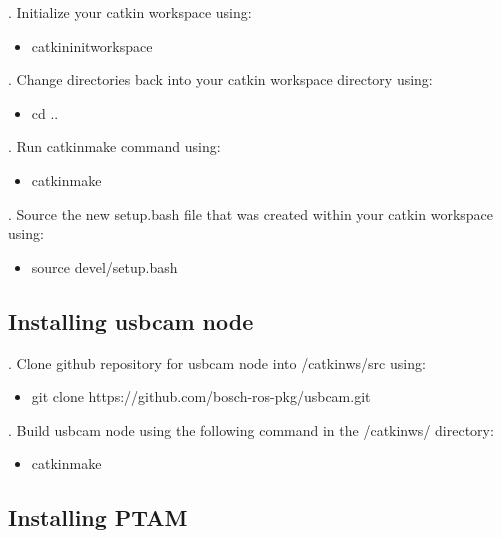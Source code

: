 . Initialize your catkin workspace using:
\begin{itemize}
	\item[]catkin\textunderscore init\textunderscore workspace
\end{itemize}

. Change directories back into your catkin workspace directory using:
\begin{itemize}
	\item[]cd ..
\end{itemize}

. Run catkin\textunderscore make command using:
\begin{itemize}
	\item[]catkin\textunderscore make
\end{itemize}

. Source the new setup.bash file that was created within your catkin workspace using:
\begin{itemize}
	\item[]source devel/setup.bash
\end{itemize}

\subsection{Installing usb\textunderscore cam node}

. Clone github repository for usb\textunderscore cam node into /catkin\textunderscore ws/src using:
\begin{itemize}
	\item[]git clone https://github.com/bosch-ros-pkg/usb\textunderscore cam.git
\end{itemize}

. Build usb\textunderscore cam node using the following command in the /catkin\textunderscore ws/ directory:
\begin{itemize}
	\item[]catkin\textunderscore make
\end{itemize}



\subsection{Installing PTAM}

